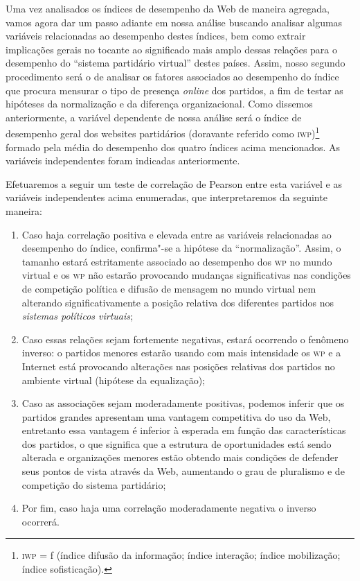 Uma vez analisados os índices de desempenho da Web de maneira agregada,
vamos agora dar um passo adiante em nossa análise buscando analisar
algumas variáveis relacionadas ao desempenho destes índices, bem como
extrair implicações gerais no tocante ao significado mais amplo dessas
relações para o desempenho do ``sistema partidário virtual'' destes
países. Assim, nosso segundo procedimento será o de analisar os fatores
associados ao desempenho do índice que procura mensurar o tipo de
presença \emph{online} dos partidos, a fim de testar as hipóteses da
normalização e da diferença organizacional. Como dissemos anteriormente,
a variável dependente de nossa análise será o índice de desempenho geral
dos websites partidários (doravante referido como \textsc{iwp})\footnote{\textsc{iwp} = f (índice difusão da informação; índice interação; índice
mobilização; índice sofisticação).} formado pela
média do desempenho dos quatro índices acima mencionados. As variáveis
independentes foram indicadas anteriormente.

Efetuaremos a seguir um teste de correlação de Pearson entre esta
variável e as variáveis independentes acima enumeradas, que
interpretaremos da seguinte maneira: 

\begin{enumerate}
\item Caso haja correlação positiva e
elevada entre as variáveis relacionadas ao desempenho do índice,
confirma"-se a hipótese da ``normalização''. Assim, o tamanho estará
estritamente associado ao desempenho dos \textsc{wp} no mundo virtual e os \textsc{wp} não
estarão provocando mudanças significativas nas condições de competição
política e difusão de mensagem no mundo virtual nem alterando
significativamente a posição relativa dos diferentes partidos nos
\textit{sistemas políticos virtuais}; 

\item Caso essas relações sejam fortemente
negativas, estará ocorrendo o fenômeno inverso: o partidos menores
estarão usando com mais intensidade os \textsc{wp} e a Internet está provocando
alterações nas posições relativas dos partidos no ambiente virtual
(hipótese da equalização); 

\item Caso as associações sejam moderadamente
positivas, podemos inferir que os partidos grandes apresentam uma
vantagem competitiva do uso da Web, entretanto essa vantagem é inferior
à esperada em função das características dos partidos, o que significa
que a estrutura de oportunidades está sendo alterada e organizações
menores estão obtendo mais condições de defender seus pontos de vista
através da Web, aumentando o grau de pluralismo e de competição do
sistema partidário; 

\item Por fim, caso haja uma correlação moderadamente
negativa o inverso ocorrerá.
\end{enumerate}

